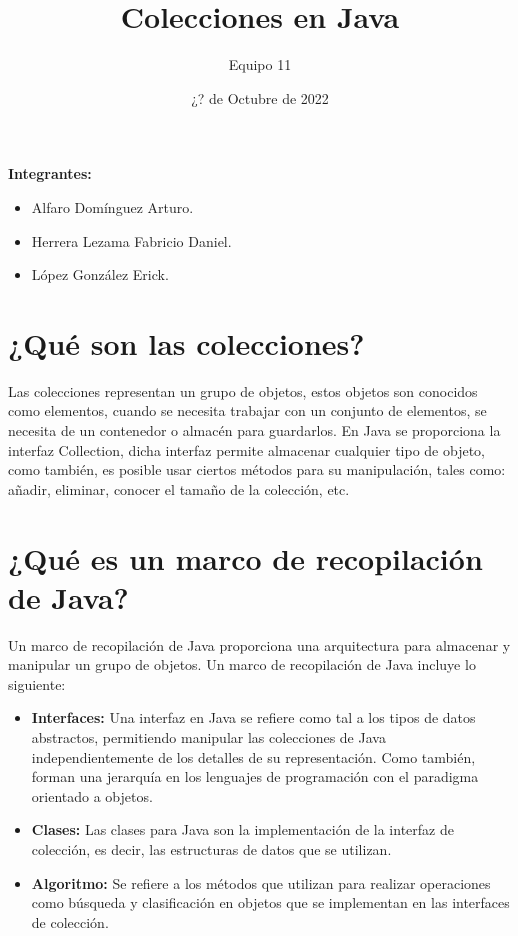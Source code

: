 \documentclass[12pt, letterpaper]{article} %
\title{Colecciones en Java}
\author{Equipo 11}
\date{¿? de Octubre de 2022}
\begin{document}
\maketitle %


\textbf{Integrantes:}
\begin{itemize}
    \item Alfaro Domínguez Arturo.
    \item Herrera Lezama Fabricio Daniel.
    \item López González Erick.
\end{itemize}

\section*{¿Qué son las colecciones?}
Las colecciones representan un grupo de objetos, estos objetos son conocidos como elementos, cuando se necesita trabajar con un conjunto de elementos, se necesita de un contenedor o almacén para guardarlos. En Java se proporciona la interfaz Collection, dicha interfaz permite almacenar cualquier tipo de objeto, como también, es posible usar ciertos métodos para su manipulación, tales como: añadir, eliminar, conocer el tamaño de la colección, etc. 

\section*{¿Qué es un marco de recopilación de Java?}

Un marco de recopilación de Java proporciona una arquitectura para almacenar y manipular un grupo de objetos. Un marco de recopilación de Java incluye lo siguiente:

\begin{itemize}
    \item \textbf{Interfaces:} Una interfaz en Java se refiere como tal a los tipos de datos abstractos, permitiendo manipular las colecciones de Java independientemente de los detalles de su representación. Como también, forman una jerarquía en los lenguajes de programación con el paradigma orientado a objetos.
    \item \textbf{Clases:} Las clases para Java son la implementación de la interfaz de colección, es decir, las estructuras de datos que se utilizan.
    \item \textbf{Algoritmo:} Se refiere a los métodos que utilizan para realizar operaciones como búsqueda y clasificación en objetos que se implementan en las interfaces de colección.
\end{itemize}
\end{document}
